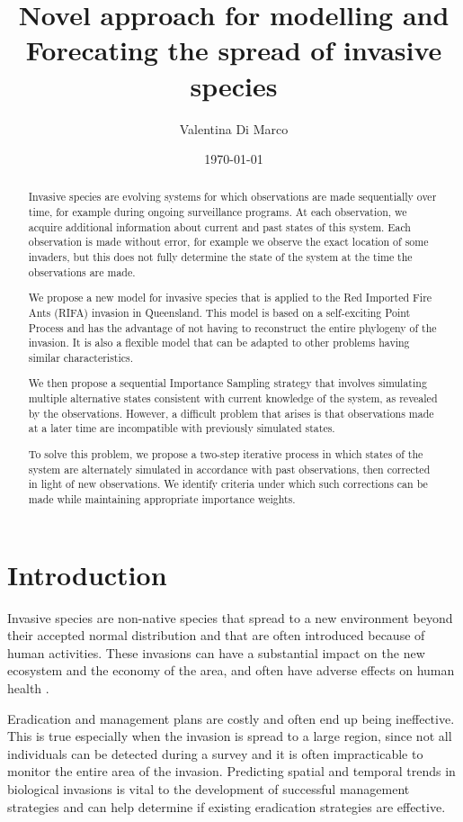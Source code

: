 \documentclass[11pt,a4paper]{article}
\title{Novel approach for modelling and Forecating the spread of invasive species}
\author{Valentina Di Marco}
\date{\today}
\begin{document}
 \maketitle



\begin{abstract}
Invasive species are evolving systems for which observations are made sequentially over time, for example during ongoing surveillance programs. At each observation, we acquire additional information about current and past states of this system. Each observation is made without error, for example we observe the exact location of some invaders, but this does not fully determine the state of the system at the time the observations are made.

We propose a new model for invasive species that is applied to the Red Imported Fire Ants (RIFA) invasion in Queensland. This model is based on a self-exciting Point Process and has the advantage of not having to reconstruct the entire phylogeny of the invasion. It is also a flexible model that can be adapted to other problems having similar characteristics.

We then propose a sequential Importance Sampling strategy that involves simulating multiple alternative states consistent with current knowledge of the system, as revealed by the observations. However, a difficult problem that arises is that observations made at a later time are incompatible with previously simulated states.

To solve this problem, we propose a two-step iterative process in which states of the system are alternately simulated in accordance with past observations, then corrected in light of new observations. We identify criteria under which such corrections can be made while maintaining appropriate importance weights.
\end{abstract}


\section{Introduction}

Invasive species are non-native species that spread to a new environment beyond their accepted normal distribution and that are often introduced because of human activities. These invasions can have a substantial impact on the new ecosystem and the economy of the area, and often have adverse effects on human health \cite{Mack}. 

Eradication and management plans are costly and often end up being ineffective. This is true especially when the invasion is spread to a large region, since not all individuals can be detected during a survey and it is often impracticable to monitor the entire area of the invasion. Predicting spatial and temporal trends in biological invasions is vital to the development of successful management strategies and can help determine if existing eradication strategies are effective.
\end{document}
